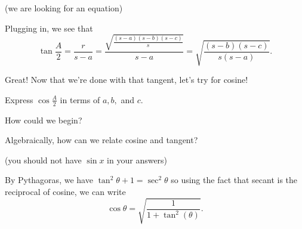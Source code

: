 (we are looking for an equation)





Plugging in, we see that $$\displaystyle\tan\frac{A}{2} = \frac{ r}{s-a}= \frac{\sqrt{\frac{(s-a)(s-b)(s-c)}{s}}} {s-a} = \sqrt{\frac{(s-b)(s-c)}{s(s-a)}}.$$

Great! Now that we're done with that tangent, let's try for cosine!

\begin{example}
Express $\displaystyle \cos{\frac{A}{2}}$ in terms of $a,b,$ and $c.$    
\end{example}

How could we begin?


Algebraically, how can we relate cosine and tangent?

(you should not have $\sin x$ in your answers)





By Pythagoras, we have $\tan^2\theta + 1 = \sec^2\theta$  so using the fact that secant is the reciprocal of cosine, we can write
$$\cos \theta = \sqrt{\frac{1}{1+\tan^2(\theta)}}.$$

